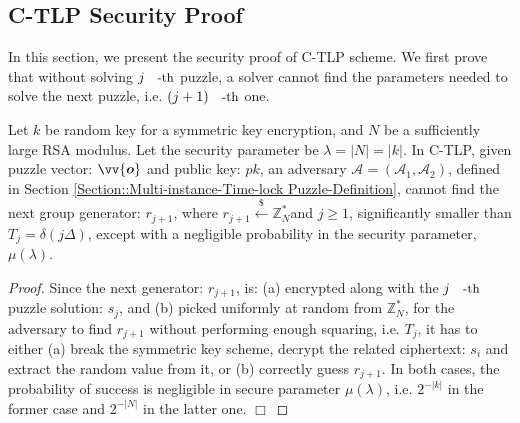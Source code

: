 
\subsection{C-TLP Security Proof}\label{CR-TLP-Proof}
 
In this section, we present   the security proof of C-TLP scheme. We first prove that without solving $j\text{\small{-th}}$ puzzle, a solver cannot find the parameters  needed to solve the next puzzle, i.e. $(j+1)\text{\small{-th}}$   one. 

 
  \begin{lemma}\label{lemma::Next-Generator-Privacy}  Let $k$ be random key for a symmetric key encryption, and  $N$ be a  sufficiently large RSA modulus. Let  the security parameter be $\lambda=|N|=|k|$.  In C-TLP, given puzzle vector: $\vv{\bm{o}}$ and public key: $pk$, an adversary $\mathcal{A}=(\mathcal{A}_{\scriptscriptstyle 1},\mathcal{A}_{\scriptscriptstyle 2})$, defined in Section \ref{Section::Multi-instance-Time-lock Puzzle-Definition},  cannot find the next group generator: 
$r_{\scriptscriptstyle j+1}$, where $r_{\scriptscriptstyle j+1} \stackrel{\scriptscriptstyle\$}\leftarrow \mathbb{Z}^{\scriptscriptstyle *}_{\scriptscriptstyle N}$and $j\geq1$, significantly smaller than   $T_{\scriptscriptstyle j}=\delta(j\Delta)$, except with a negligible probability in the security parameter, $\mu(\lambda)$. 
  \end{lemma}
 \begin{proof}
Since the next generator: $r_{\scriptscriptstyle j+1}$, is: (a) encrypted along with the $j\text{\small{-th}}$ puzzle solution: $s_{\scriptscriptstyle j}$, and (b)  picked uniformly at random from $\mathbb{Z}^{\scriptscriptstyle *}_{\scriptscriptstyle N}$, for the adversary to find $r_{\scriptscriptstyle j+1}$ without performing enough squaring, i.e. $T_{\scriptscriptstyle j}$, it has to either (a) break the symmetric key scheme, decrypt the related ciphertext: $s_{\scriptscriptstyle i}$ and extract the random value from it, or (b) correctly guess $r_{\scriptscriptstyle j+1}$. In both cases, the probability of success is negligible in secure parameter $\mu(\lambda)$,  i.e. $2^{\scriptscriptstyle -|k|}$ in the former case and $2^{\scriptscriptstyle -|N|}$ in the latter one.  
 \hfill\(\Box\)
  \end{proof} 
  
